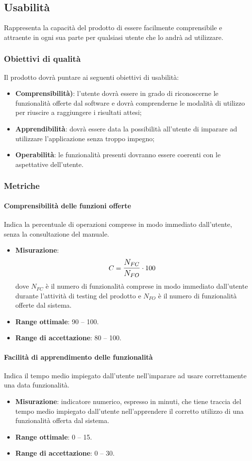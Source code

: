 \subsection{Usabilità}
Rappresenta la capacità del prodotto di essere facilmente comprensibile e attraente in ogni sua parte per qualsiasi utente che lo andrà ad utilizzare.

\subsubsection{Obiettivi di qualità}
Il prodotto dovrà puntare ai seguenti obiettivi di usabilità:
\begin{itemize}
\item \textbf{Comprensibilità)}: l'utente dovrà essere in grado di riconoscerne le funzionalità offerte dal software e dovrà comprenderne le modalità di utilizzo per riuscire a raggiungere i risultati attesi;
\item \textbf{Apprendibilità}: dovrà essere data la possibilità all'utente di imparare ad utilizzare l'applicazione senza troppo impegno;
\item \textbf{Operabilità}: le funzionalità presenti dovranno essere coerenti con le aspettative dell'utente.
\end{itemize}

\subsubsection{Metriche}
\paragraph{Comprensibilità delle funzioni offerte}
Indica la percentuale di operazioni comprese in modo immediato dall'utente, senza la consultazione del manuale.
\begin{itemize}
	\item \textbf{Misurazione}: 
		$$C=\mathlarger{\frac{N_{FC}}{N_{FO}}} \cdot 100$$
	dove $N_{FC}$ è il numero di funzionalità comprese in modo immediato dall'utente durante l'attività di testing del prodotto e $N_{FO}$ è il numero di funzionalità offerte dal sistema.
	\item \textbf{Range ottimale}: 90 -- 100.
	\item \textbf{Range di accettazione}: 80 -- 100.
\end{itemize}

\paragraph{Facilità di apprendimento delle funzionalità}
Indica il tempo medio impiegato dall'utente nell'imparare ad usare correttamente una data funzionalità.
\begin{itemize}
	\item \textbf{Misurazione}: indicatore numerico, espresso in minuti, che tiene traccia del tempo medio impiegato dall'utente nell'apprendere il corretto utilizzo di una funzionalità offerta dal sistema.
	\item \textbf{Range ottimale}: 0 -- 15.
	\item \textbf{Range di accettazione}: 0 -- 30.
\end{itemize}

